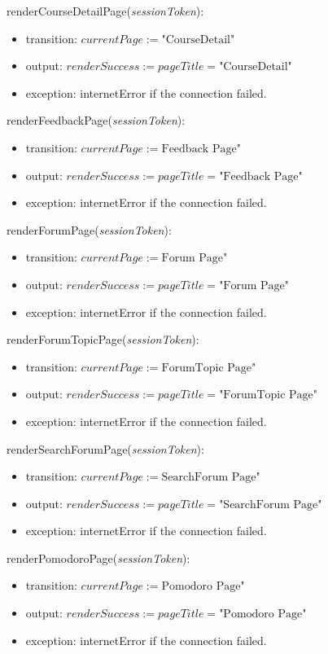 \documentclass[12pt, titlepage]{article}
\begin{document}
\noindent renderCourseDetailPage(\textit{sessionToken}):
\begin{itemize}
\item transition: \(currentPage := \text{"CourseDetail"}\)
\item output: \(renderSuccess := pageTitle = \text{"CourseDetail"}\)
\item exception: internetError if the connection failed.
\end{itemize}

\noindent renderFeedbackPage(\textit{sessionToken}):
\begin{itemize}
\item transition: \(currentPage := \text{Feedback Page"}\)
\item output: \(renderSuccess := pageTitle = \text{"Feedback Page"}\)
\item exception: internetError if the connection failed.
\end{itemize}

\noindent renderForumPage(\textit{sessionToken}):
\begin{itemize}
\item transition: \(currentPage := \text{Forum Page"}\)
\item output: \(renderSuccess := pageTitle = \text{"Forum Page"}\)
\item exception: internetError if the connection failed.
\end{itemize}

\noindent renderForumTopicPage(\textit{sessionToken}):
\begin{itemize}
\item transition: \(currentPage := \text{ForumTopic Page"}\)
\item output: \(renderSuccess := pageTitle = \text{"ForumTopic Page"}\)
\item exception: internetError if the connection failed.
\end{itemize}

\noindent renderSearchForumPage(\textit{sessionToken}):
\begin{itemize}
\item transition: \(currentPage := \text{SearchForum Page"}\)
\item output: \(renderSuccess := pageTitle = \text{"SearchForum Page"}\)
\item exception: internetError if the connection failed.
\end{itemize}

\noindent renderPomodoroPage(\textit{sessionToken}):
\begin{itemize}
\item transition: \(currentPage := \text{Pomodoro Page"}\)
\item output: \(renderSuccess := pageTitle = \text{"Pomodoro Page"}\)
\item exception: internetError if the connection failed.
\end{itemize}
\end{document}
